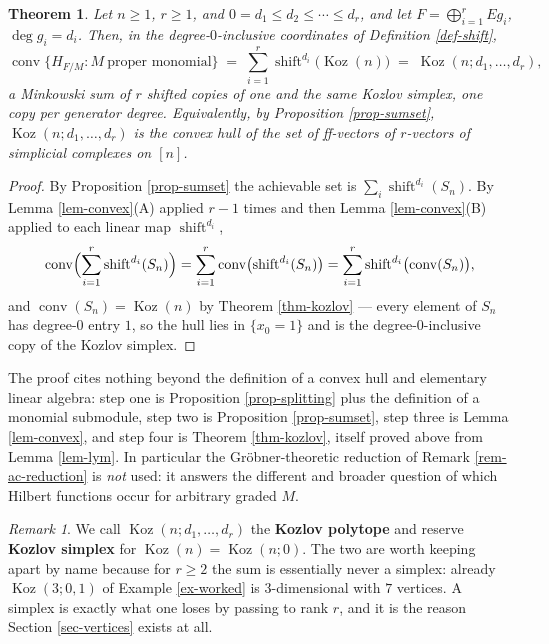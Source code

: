 \documentclass[11pt, a4paper, abstract=yes]{scrartcl}
\theoremstyle{definition}
\theoremstyle{remark}
\newtheorem{remark}[definition]{Remark}
\theoremstyle{plain}
\newtheorem{theorem}[definition]{Theorem}
\newcommand{\Koz}{\operatorname{Koz}}
\newcommand{\shift}{\operatorname{shift}}
\newcommand{\leanpartial}{\tikz[baseline=-0.6ex]{\fill[leanfull] (0,-0.6ex) arc (-90:90:0.6ex) -- cycle;\draw[leanfull,line width=0.5pt] (0,0) circle (0.6ex);}}
\newcommand{\compmark}{\tikz[baseline=-0.6ex]\fill[compmark] (-0.55ex,-0.55ex) rectangle (0.55ex,0.55ex);}
\newcommand{\leanmark}[1]{\leavevmode{\reversemarginpar\marginnote{\raggedleft#1}}}
\newcommand{\conv}{\operatorname{conv}}
\begin{document}
\begin{theorem}
\leanmark{\leanpartial\,\compmark}Let \(n\ge1\), \(r\ge1\), and \(0=d_1\le d_2\le\cdots\le d_r\), and let
\(F=\bigoplus_{i=1}^rEg_i\), \(\deg g_i=d_i\). Then, in the degree-\(0\)-inclusive coordinates of
Definition \ref{def-shift},
\begin{equation}\label{eq:main}
  \conv\bigl\lbrace H_{F/M}: M\ \text{proper monomial}\bigr\rbrace
  \;=\;\sum_{i=1}^{r}\shift^{d_i}\bigl(\Koz(n)\bigr)\;=\;\Koz(n;d_1,\dots,d_r),
\end{equation}
a Minkowski sum of \(r\) shifted copies of one and the same Kozlov simplex, one copy per generator
degree. Equivalently, by Proposition \ref{prop-sumset}, \(\Koz(n;d_1,\dots,d_r)\) is the convex hull of
the set of \emph{ff}-vectors of \(r\)-vectors of simplicial complexes on \([n]\).
\label{thm:main}
\label{thm-main}
\end{theorem}

\begin{proof}
By Proposition \ref{prop-sumset} the achievable set is \(\sum_i\shift^{d_i}(S_n)\). By
Lemma \ref{lem-convex}(A) applied \(r-1\) times and then Lemma \ref{lem-convex}(B) applied to each linear map
\(\shift^{d_i}\),
\begin{equation}\label{eq:main-2}
  \conv\Bigl(\sum_{i=1}^r\shift^{d_i}(S_n)\Bigr)
  =\sum_{i=1}^r\conv\bigl(\shift^{d_i}(S_n)\bigr)
  =\sum_{i=1}^r\shift^{d_i}\bigl(\conv(S_n)\bigr),
\end{equation}
and \(\conv(S_n)=\Koz(n)\) by Theorem \ref{thm-kozlov} --- every element of \(S_n\) has degree-\(0\)
entry \(1\), so the hull lies in \(\lbrace x_0=1\rbrace\) and is the degree-\(0\)-inclusive copy of
the Kozlov simplex.
\end{proof}

The proof cites nothing beyond the definition of a convex hull and elementary linear algebra: step
one is Proposition \ref{prop-splitting} plus the definition of a monomial submodule, step two is
Proposition \ref{prop-sumset}, step three is Lemma \ref{lem-convex}, and step four is Theorem \ref{thm-kozlov},
itself proved above from Lemma \ref{lem-lym}. In particular the Gröbner-theoretic reduction of
Remark \ref{rem-ac-reduction} is \emph{not} used: it answers the different and broader question of which
Hilbert functions occur for arbitrary graded \(M\).

\begin{remark}
We call \(\Koz(n;d_1,\dots,d_r)\) the \textbf{Kozlov polytope} and reserve \textbf{Kozlov simplex} for
\(\Koz(n)=\Koz(n;0)\). The two are worth keeping apart by name because for \(r\ge2\) the sum is
essentially never a simplex: already \(\Koz(3;0,1)\) of Example \ref{ex-worked} is \(3\)-dimensional with
\(7\) vertices. A simplex is exactly what one loses by passing to rank \(r\), and it is the reason
Section \ref{sec-vertices} exists at all.
\label{rem-name}
\end{remark}
\end{document}
